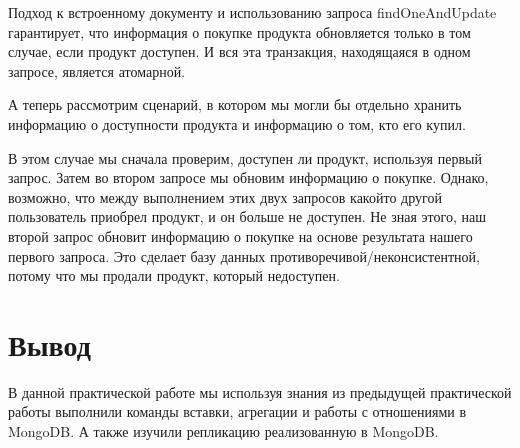 Подход к встроенному документу и использованию запроса
findOneAndUpdate гарантирует, что информация о покупке продукта обновляется
только в том случае, если продукт доступен. И вся эта транзакция, находящаяся
в одном запросе, является атомарной.\par
А теперь рассмотрим сценарий, в котором мы могли бы отдельно хранить
информацию о доступности продукта и информацию о том, кто его купил.\par
В этом случае мы сначала проверим, доступен ли продукт, используя
первый запрос. Затем во втором запросе мы обновим информацию о
покупке. Однако, возможно, что между выполнением этих двух запросов какойто другой пользователь приобрел продукт, и он больше не доступен. Не зная
этого, наш второй запрос обновит информацию о покупке на основе результата
нашего первого запроса. Это сделает базу данных
противоречивой/неконсистентной, потому что мы продали продукт, который
недоступен.

\clearpage

\section*{\LARGE Вывод}
В данной практической работе мы используя знания из
предыдущей практической работы выполнили команды вставки, агрегации
и работы с отношениями в MongoDB.
А также изучили репликацию реализованную в MongoDB.

